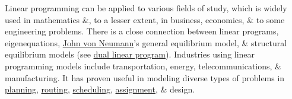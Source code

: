 \documentclass{article}
\begin{document}
Linear programming can be applied to various fields of study, which is widely used in mathematics \&, to a lesser extent, in business, economics, \& to some engineering problems. There is a close connection between linear programs, eigenequations, \href{https://en.wikipedia.org/wiki/John_von_Neumann}{John von Neumann}'s general equilibrium model, \& structural equilibrium models (see \href{https://en.wikipedia.org/wiki/Dual_linear_program}{dual linear program}). Industries using linear programming models include transportation, energy, telecommunications, \& manufacturing. It has proven useful in modeling diverse types of problems in \href{https://en.wikipedia.org/wiki/Automated_planning_and_scheduling}{planning}, \href{https://en.wikipedia.org/wiki/Routing}{routing}, \href{https://en.wikipedia.org/wiki/Scheduling_(production_processes)}{scheduling}, \href{https://en.wikipedia.org/wiki/Assignment_problem}{assignment}, \& design.
\end{document}
